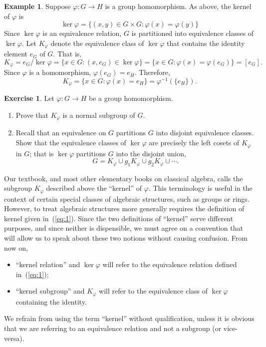 \documentclass[12pt]{article}
\theoremstyle{plain}
\theoremstyle{definition}
\newtheorem{example}[theorem]{Example}
\newtheorem{exercise}{Exercise}
\theoremstyle{remark}
\theoremstyle{remark}
\numberwithin{theorem}{section}
\numberwithin{equation}{section}
\newcommand{\<}{\ensuremath{\langle}}
\renewcommand{\>}{\ensuremath{\rangle}}
\begin{document}
\begin{example}
  Suppose $\varphi: G \rightarrow H$ is a group homomorphism.  As above, the
  kernel of $\varphi$ is
  \begin{equation}
    \label{eq:1}
  \ker \varphi = \{(x, y) \in G \times G :  \varphi(x) = \varphi(y)\}
  \end{equation}
  Since $\ker \varphi$ is an equivalence relation, $G$ is partitioned into
  equivalence classes of $\ker \varphi$. 
  Let $K_\varphi$ denote the equivalence class of
  $\ker \varphi$ that contains the identity element $e_G$ of $G$.  That is,
  \[
  K_\varphi = e_G/\ker\varphi = \{x \in G :  (x, e_G) \in \ker \varphi\} =
  \{x \in G :  \varphi(x) = \varphi(e_G)\} = [e_G].
  \]
  Since $\varphi$ is a homomorphism, $\varphi(e_G) = e_H$.  Therefore,
   \[
   K_\varphi=  \{x \in G :  \varphi(x) = e_H\} =  \varphi^{-1}(\{e_H\}).
   \]
\end{example}
\begin{exercise}  Let $\varphi: G \rightarrow H$ be a group homomorphism.
  \begin{enumerate}
  \item 
    Prove that $K_\varphi$ %
    is a normal subgroup of $G$.  
  \item 
    Recall that an equivalence on $G$ partitions $G$ into disjoint equivalence
    classes.  Show that the equivalence classes of $\ker \varphi$ are precisely the
    left cosets of $K_\varphi$ in $G$; that is $\ker \varphi$ partitions $G$ into 
    the disjoint union,
    \[
    G = K_\varphi \cup g_1K_\varphi \cup g_2K_\varphi\cup \cdots.
    \]
  \end{enumerate}
\end{exercise}

 Our textbook, and most other elementary
  books on classical algebra, calls the subgroup $K_\varphi$ described above
  the ``kernel'' of $\varphi$. 
  This terminology is useful in the context of certain
  special classes of algebraic structures, such as groups or rings.  However, 
  to treat algebraic structures more generally requires
  the definition of kernel given in~(\ref{eq:1}).
  Since the two definitions of ``kernel'' serve different purposes, and since
  neither is dispensible, we must agree on a convention that will allow us to
  speak about these two notions without causing confusion. From now on, 
  \begin{itemize}
  \item ``kernel relation'' and $\ker \varphi$
    will refer to the equivalence relation defined in~(\ref{eq:1});
  \item ``kernel subgroup'' and $K_\varphi$
    will refer to the equivalence class of $\ker \varphi$ containing the
    identity.
  \end{itemize}
  We refrain from using the term ``kernel'' without qualification, unless it is
  obvious that we are referring to an equivalence relation and not a subgroup
  (or vice-versa).
\end{document}
